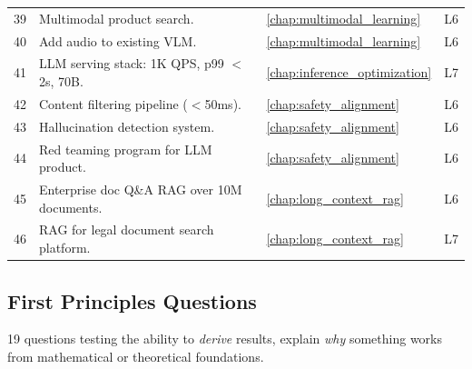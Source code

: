\begin{longtable}{rp{8.5cm}ll}
39 & Multimodal product search. & \ref{chap:multimodal_learning} & L6 \\
40 & Add audio to existing VLM. & \ref{chap:multimodal_learning} & L6 \\
41 & LLM serving stack: 1K QPS, p99 $<$ 2s, 70B. & \ref{chap:inference_optimization} & L7 \\
42 & Content filtering pipeline ($<$50ms). & \ref{chap:safety_alignment} & L6 \\
43 & Hallucination detection system. & \ref{chap:safety_alignment} & L6 \\
44 & Red teaming program for LLM product. & \ref{chap:safety_alignment} & L6 \\
45 & Enterprise doc Q\&A RAG over 10M documents. & \ref{chap:long_context_rag} & L6 \\
46 & RAG for legal document search platform. & \ref{chap:long_context_rag} & L7 \\
\end{longtable}

\subsection{First Principles Questions}

19 questions testing the ability to \textit{derive} results, explain \textit{why} something works from mathematical or theoretical foundations.

